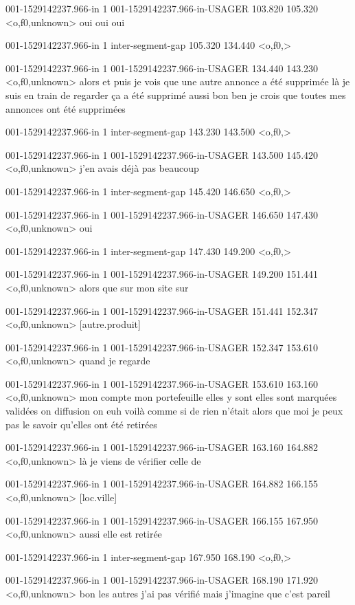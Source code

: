 001-1529142237.966-in 1 001-1529142237.966-in-USAGER 103.820 105.320 <o,f0,unknown> oui oui oui

001-1529142237.966-in 1 inter-segment-gap 105.320 134.440 <o,f0,>

001-1529142237.966-in 1 001-1529142237.966-in-USAGER 134.440 143.230 <o,f0,unknown> alors et puis je vois que une autre annonce a été supprimée là je suis en train de regarder ça a été supprimé aussi bon ben je crois que toutes mes annonces ont été supprimées

001-1529142237.966-in 1 inter-segment-gap 143.230 143.500 <o,f0,>

001-1529142237.966-in 1 001-1529142237.966-in-USAGER 143.500 145.420 <o,f0,unknown> j'en avais déjà pas beaucoup

001-1529142237.966-in 1 inter-segment-gap 145.420 146.650 <o,f0,>

001-1529142237.966-in 1 001-1529142237.966-in-USAGER 146.650 147.430 <o,f0,unknown> oui

001-1529142237.966-in 1 inter-segment-gap 147.430 149.200 <o,f0,>

001-1529142237.966-in 1 001-1529142237.966-in-USAGER 149.200 151.441 <o,f0,unknown> alors que sur mon site sur

001-1529142237.966-in 1 001-1529142237.966-in-USAGER 151.441 152.347 <o,f0,unknown> [autre.produit]

001-1529142237.966-in 1 001-1529142237.966-in-USAGER 152.347 153.610 <o,f0,unknown> quand je regarde

001-1529142237.966-in 1 001-1529142237.966-in-USAGER 153.610 163.160 <o,f0,unknown> mon compte mon portefeuille elles y sont elles sont marquées validées on diffusion on euh voilà comme si de rien n'était alors que moi je peux pas le savoir qu'elles ont été retirées

001-1529142237.966-in 1 001-1529142237.966-in-USAGER 163.160 164.882 <o,f0,unknown> là je viens de vérifier celle de

001-1529142237.966-in 1 001-1529142237.966-in-USAGER 164.882 166.155 <o,f0,unknown> [loc.ville]

001-1529142237.966-in 1 001-1529142237.966-in-USAGER 166.155 167.950 <o,f0,unknown> aussi elle est retirée

001-1529142237.966-in 1 inter-segment-gap 167.950 168.190 <o,f0,>

001-1529142237.966-in 1 001-1529142237.966-in-USAGER 168.190 171.920 <o,f0,unknown> bon les autres j'ai pas vérifié mais j'imagine que c'est pareil

